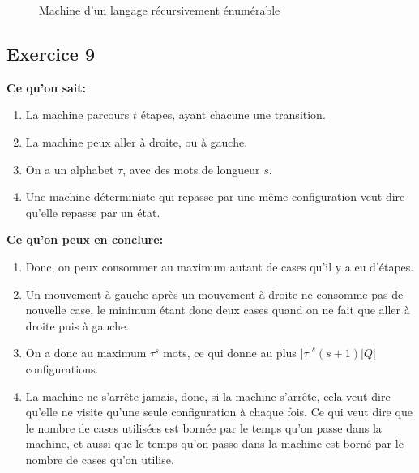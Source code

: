 \begin{figure}[ht]
  \centering
  \caption{Machine d'un langage récursivement énumérable}
\end{figure}

\newpage

\subsection{Exercice 9}

\textbf{Ce qu'on sait:}
\begin{enumerate}
  \item La machine parcours $t$ étapes, ayant chacune une transition.
  \item La machine peux aller à droite, ou à gauche.
  \item On a un alphabet $\tau$, avec des mots de longueur $s$.
  \item Une machine déterministe qui repasse par une même configuration veut dire qu'elle repasse par un état.
\end{enumerate}

\textbf{Ce qu'on peux en conclure:}
\begin{enumerate}
  \item Donc, on peux consommer au maximum autant de cases qu'il y a eu d'étapes.
  \item Un mouvement à gauche après un mouvement à droite ne consomme pas de nouvelle case,
  le minimum étant donc deux cases quand on ne fait que aller à droite puis à gauche.
  \item On a donc au maximum $\tau^s$ mots, ce qui donne au plus $|\tau|^s(s+1)|Q|$ configurations.
  \item La machine ne s'arrête jamais, donc, si la machine s'arrête, cela veut dire qu'elle ne visite qu'une seule configuration à chaque fois.
  Ce qui veut dire que le nombre de cases utilisées est bornée par le temps qu'on passe dans la machine, et aussi que le temps qu'on passe dans
  la machine est borné par le nombre de cases qu'on utilise.
\end{enumerate}
